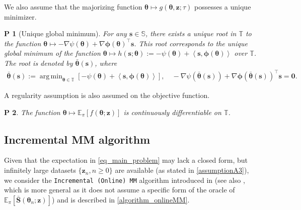 \documentclass{article}
\newcommand{\zero}{\ensuremath{\mathbf{0}}}
\def\phib        {{\sbmm{\phi}}\XS}        \def\Phib       {{\sbmm{\Phi}}\XS}
\def\XS{\xspace}
\def\sbmm#1{\ensuremath{\boldsymbol{#1}}}
\newtheorem{assumptionP}{P}
\def\eqdef{:=}
\def\PE{\mathbb{E}_\pi} %
\def\param{\vtheta}
\def\barparam{\bar{\param}}
\newcommand{\pscal}[2]{\left\langle#1,#2\right\rangle} %
\def\bars{\bar{\vS}}
\def\rvz{{\mathbf{z}}}
\def\vtheta{{\bm{\theta}}}
\def\vs{{\bm{s}}}
\def\vS{{\bm{S}}}
\def\vz{{\bm{z}}}
\def\sS{{\mathbb{S}}}
\def\sT{{\mathbb{T}}}
\DeclareMathOperator*{\argmin}{arg\,min}
\begin{document}
We also assume that the majorizing function $\vtheta \mapsto g(\vtheta,\vz; \tau)$ possesses a unique minimizer. 
\begin{assumptionP}[Unique global minimum]\label{assumptionA4}
For any $\vs \in \sS$, there exists a unique root in $\mathbb{T}$ to the function $\vtheta \mapsto - \nabla \psi(\vtheta) + \nabla \phib(\vtheta)^\top \vs$. This root corresponds to the unique global minimum of the function $\vtheta \mapsto h(\vs; \vtheta) \eqdef - \psi(\vtheta) + \pscal{\vs}{\phib(\vtheta)}$ over $\sT$. The root is denoted by $\barparam(\vs)$, where  
\begin{align}\label{eq_global_maximum}
    \barparam(\vs) \eqdef \argmin_{\vtheta \in \sT}[- \psi(\vtheta) + \pscal{\vs}{\phib(\vtheta)}], \quad - \nabla \psi(\barparam(\vs)) + \nabla \phib(\barparam(\vs))^\top \vs = \zero.
\end{align}
\end{assumptionP}
A regularity assumption is also assumed on the objective function.

\begin{assumptionP}\label{assumptionObjectiveC1}
    The function $\vtheta \mapsto \PE\left[f(\vtheta;\rvz)\right]$ is continuously differentiable on $\sT$.
\end{assumptionP}

\subsection{Incremental MM algorithm}\label{sec_exponential_minorizer_surrogate}
Given that the expectation in \cref{eq_main_problem} may lack a closed form, but infinitely large datasets $\{\rvz_n, n \geq 0\}$ are available (as stated in \cref{assumptionA3}), we consider the {\tt Incremental (Online) MM} algorithm introduced in \cite{nguyen_online_2023} (see also \cite{dieuleveut_federated_2025}, which is more general as it does not assume a specific form of the oracle of $\PE\left[\bars(\vtheta_n; \rvz)\right]$) and is described in \cref{algorithm_onlineMM}.
\end{document}
